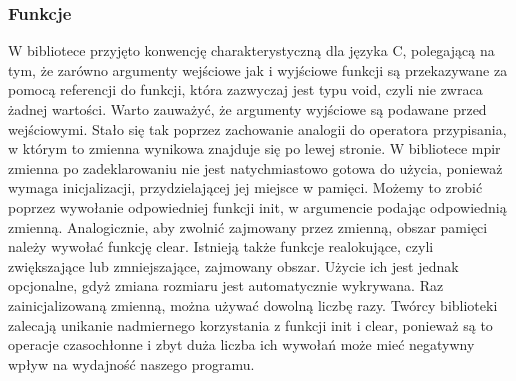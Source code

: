 \documentclass[twoside,a4paper]{book}
\begin{document}
\subsubsection{Funkcje}
W bibliotece przyjęto konwencję charakterystyczną dla języka C, polegającą na tym, że zarówno argumenty wejściowe jak i wyjściowe funkcji są przekazywane za pomocą referencji do funkcji, która zazwyczaj jest typu void, czyli nie zwraca żadnej wartości. Warto zauważyć, że argumenty wyjściowe są podawane przed wejściowymi. Stało się tak poprzez zachowanie analogii do operatora przypisania, w którym to zmienna wynikowa znajduje się po lewej stronie.
W bibliotece mpir zmienna po zadeklarowaniu nie jest natychmiastowo gotowa do użycia, ponieważ wymaga inicjalizacji, przydzielającej jej miejsce w pamięci. Możemy to zrobić poprzez wywołanie odpowiedniej funkcji init, w argumencie podając odpowiednią zmienną. Analogicznie, aby zwolnić zajmowany przez zmienną, obszar pamięci należy wywołać funkcję clear. Istnieją także funkcje realokujące, czyli zwiększające lub zmniejszające, zajmowany obszar. Użycie ich jest jednak opcjonalne, gdyż zmiana rozmiaru jest automatycznie wykrywana. Raz zainicjalizowaną zmienną, można używać dowolną liczbę razy. Twórcy biblioteki zalecają unikanie nadmiernego korzystania z funkcji init i clear, ponieważ są to operacje czasochłonne i zbyt duża liczba ich wywołań może mieć negatywny wpływ na wydajność naszego programu.
\end{document}
